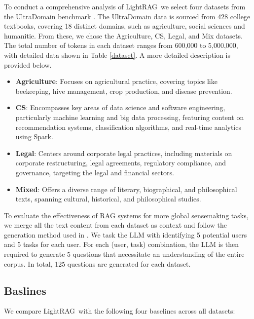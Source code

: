 \documentclass{article} %
\def\model{LightRAG}
\begin{document}
To conduct a comprehensive analysis of \model\, we select four datasets from the UltraDomain benchmark \cite{qian2024memorag}. The UltraDomain data is sourced from 428 college textbooks, covering 18 distinct domains, such as agriculture, social sciences and humanitie. From these, we chose the Agriculture, CS, Legal, and Mix datasets. The total number of tokens in each dataset ranges from 600,000 to 5,000,000, with detailed data shown in Table \ref{dataset}. A more detailed description is provided below.
\begin{itemize}
    \item \textbf{Agriculture}: Focuses on agricultural practice, covering topics like beekeeping, hive management, crop production, and disease prevention.
    
    \item  \textbf{CS}: Encompasses key areas of data science and software engineering, particularly machine learning and big data processing, featuring content on recommendation systems, classification algorithms, and real-time analytics using Spark.
    
    \item \textbf{Legal}: Centers around corporate legal practices, including materials on corporate restructuring, legal agreements, regulatory compliance, and governance, targeting the legal and financial sectors.
    
    \item \textbf{Mixed}: Offers a diverse range of literary, biographical, and philosophical texts, spanning cultural, historical, and philosophical studies.
\end{itemize}

To evaluate the effectiveness of RAG systems for more global sensemaking tasks, we merge all the text content from each dataset as context and follow the generation method used in \cite{edge2024local}. We task the LLM with identifying 5 potential users and 5 tasks for each user. For each (user, task) combination, the LLM is then required to generate 5 questions that necessitate an understanding of the entire corpus. In total, 125 questions are generated for each dataset.

\subsection{Baslines}
We compare \model\ with the following four baselines across all datasets:
\end{document}
